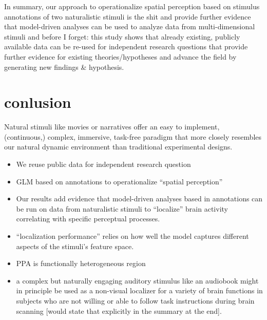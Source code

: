 \documentclass[english]{article}
\begin{document}

In summary, our approach to operationalize spatial perception based on stimulus
annotations of two naturalistic stimuli is the shit and provide further evidence
that model-driven analyses can be used to analyze data from multi-dimensional
stimuli
%
and before I forget: this study shows that already existing, publicly
available data can be re-used for independent research questions that provide
further evidence for existing theories/hypotheses and advance the field by
generating new findings \& hypothesis.


\section{conlusion}


Natural stimuli like movies \citep{eickhoff2020towards,
hasson2008neurocinematics, sonkusare2019naturalistic} or narratives
\citep{hamilton2018revolution, honey2012not, lerner2011topographic,
silbert2014coupled, wilson2008beyond} offer an easy to implement, (continuous,)
complex, immersive, task-free paradigm that more closely resembles our natural
dynamic environment than traditional experimental designs.

\begin{itemize}
\item We reuse public data for independent research question
\item GLM based on annotations to operationalize ``spatial perception''
\item Our results add evidence that model-driven analyses based in annotations
can be run on data from naturalistic stimuli to ``localize'' brain activity
correlating with specific perceptual processes.
\item ``localization performance'' relies on how well the model captures
different aspects of the stimuli's feature space.
\item PPA is functionally heterogeneous region
\item a complex but naturally engaging auditory stimulus like an
audiobook might in principle be used as a non-visual localizer for a variety of
brain functions in subjects who are not willing or able to follow task
instructions during brain scanning [would state that explicitly in the summary
at the end].
\end{itemize}
\end{document}
